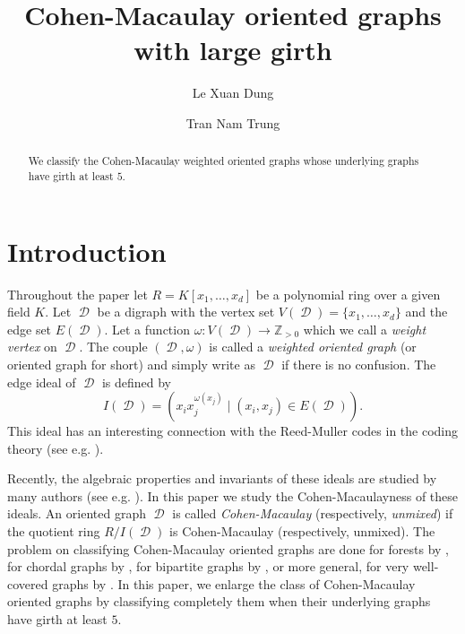 \documentclass[12pt, amscd]{amsart}
\theoremstyle{definition}
\DeclareMathOperator{\D}{\mathcal{D}}
\def\Z {\mathbb Z}
\newcommand{\0}{\bold{0}}
\begin{document}
\title[Cohen-Macaulay oriented graphs with large girth] {Cohen-Macaulay oriented graphs with large girth}

\author[L.X. Dung]{Le Xuan Dung}
\address{Faculty of Natural Sciences, Hong Duc University,
No. 565 Quang Trung Street, Dong Ve Ward, Thanh Hoa, Vietnam}

\author[T.N. Trung]{ Tran Nam Trung}
\address{Institute of Mathematics, VAST, 18 Hoang Quoc Viet, Hanoi, Viet Nam.}

\date{}
\commby{}
\begin{abstract}
We classify the Cohen-Macaulay weighted oriented graphs whose underlying graphs have girth at least $5$. 
\end{abstract}
\maketitle
\section*{Introduction}

Throughout the paper let $R = K[x_1,\ldots,x_d]$ be a polynomial ring over a given field $K$. Let $\D$ be a digraph with the vertex set $V(\D)=\{x_1,\ldots,x_d\}$ and the edge set $E(\D)$. Let  a function $\omega \colon V(\D) \to \Z_{>0}$ which we call a {\it weight vertex} on $\D$.  The couple $(\D,\omega)$ is called  a {\it weighted oriented graph} (or oriented graph for short) and simply write as $\D$ if there is no confusion.  The edge ideal of $\D$ is defined by
$$I(\D) = (x_ix_j^{\omega(x_j)} \mid (x_i,x_j)\in E(\D)).$$
This ideal has an interesting connection with the Reed-Muller codes in the coding theory (see e.g. \cite{HLMRV, MPV}).

Recently, the algebraic properties and invariants of these ideals are studied by many authors (see e.g. \cite{CK, GMSVV, GMV, HLMRV, KN, MP, MPV, PRT, PRV,S, SS, SSTY,ZWT}). In this paper we study the Cohen-Macaulayness of these ideals. An oriented graph $\D$ is called {\it Cohen-Macaulay} (respectively, {\it unmixed}) if the quotient ring $R/I(\D)$ is Cohen-Macaulay (respectively, unmixed). The problem on classifying Cohen-Macaulay oriented graphs are done for forests by \cite{GMSVV}, for chordal graphs by \cite{S}, for bipartite graphs by \cite{HLMRV}, or more general, for very well-covered graphs by \cite{PRV}. In this paper, we enlarge the class of Cohen-Macaulay oriented graphs by classifying completely them when their underlying graphs have girth at least $5$.  
\end{document}
